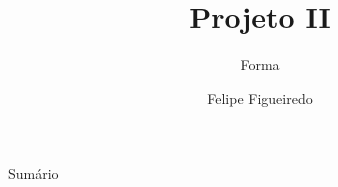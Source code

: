 \documentclass{beamer}
\title%
{Projeto II}
\subtitle
{Forma} %
\author%
{Felipe Figueiredo}%
\institute[INTO] %
{Instituto Nacional de Traumatologia e Ortopedia
}
\date%
{}
\begin{document}
\begin{frame}
  \titlepage
\end{frame}

\begin{frame}{Sumário}
  \tableofcontents
\end{frame}








\end{document}
